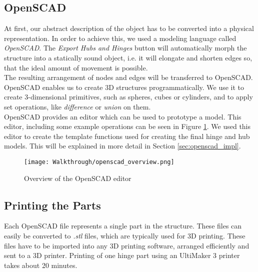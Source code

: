 \subsection{OpenSCAD}
At first, our abstract description of the object has to be converted into a physical representation. In order to achieve this, we used a modeling language called \textit{OpenSCAD}. The \textit{Export Hubs and Hinges} button will automatically morph the structure into a statically sound object, i.e. it will elongate and shorten edges so, that the ideal amount of movement is possible. \\
The resulting arrangement of nodes and edges will be transferred to OpenSCAD. OpenSCAD enables us to create 3D structures programmatically. We use it to create 3-dimensional primitives, such as spheres, cubes or cylinders, and to apply set operations, like \textit{difference} or \textit{union} on them.\\
OpenSCAD provides an editor which can be used to prototype a model. This editor, including some example operations can be seen in Figure \ref{fig:openscad_overview}. We used this editor to create the template functions used for creating the final hinge and hub models. This will be explained in more detail in Section \ref{sec:openscad_impl}.
\begin{figure}[h!]
    \texttt{[image: Walkthrough/openscad\_overview.png]}
    \centering
    \caption{Overview of the OpenSCAD editor}
    \label{fig:openscad_overview}
\end{figure}

\subsection{Printing the Parts}
Each OpenSCAD file represents a single part in the structure. These files can easily be converted to \textit{.stl} files, which are typically used for 3D printing. These files have to be imported into any 3D printing software, arranged efficiently and sent to a 3D printer. Printing of one hinge part using an UltiMaker 3 printer takes about 20 minutes.

